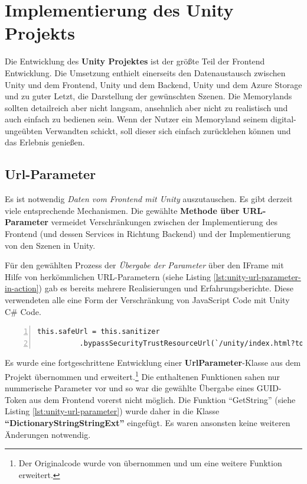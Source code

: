 \section{Implementierung des Unity Projekts}

Die Entwicklung des \textbf{Unity Projektes} ist der grö\ss{}te Teil der Frontend Entwicklung. Die Umsetzung enthielt einerseits den Datenaustausch zwischen Unity und dem Frontend, Unity und dem Backend, Unity und dem Azure Storage und zu guter Letzt, die Darstellung der gewünschten Szenen. Die Memorylands sollten detailreich aber nicht langsam, ansehnlich aber nicht zu realistisch und auch einfach zu bedienen sein. Wenn der Nutzer ein Memoryland seinem digital-ungeübten Verwandten schickt, soll dieser sich einfach zurücklehen können und das Erlebnis genie\ss{}en.



\subsection{Url-Parameter}
\label{subsec:unity-url-parameter}

Es ist notwendig \emph{Daten vom Frontend mit Unity} auszutauschen. Es gibt derzeit viele entsprechende Mechanismen. Die gewählte \textbf{Methode über URL-Parameter} vermeidet Verschränkungen zwischen der Implementierung des Frontend (und dessen Services in Richtung Backend) und der Implementierung von den Szenen in Unity.


Für den gewählten Prozess der \emph{Übergabe der Parameter} über den IFrame mit Hilfe von herkömmlichen URL-Parametern (siehe Listing \ref{lst:unity-url-parameter-in-action}) gab es bereits mehrere Realisierungen und Erfahrungsberichte. Diese verwendeten alle eine Form der Verschränkung von JavaScript Code mit Unity C\# Code. 



\begin{lstlisting}[numbers=left,caption={IFrame for Unity in Frontend},label={lst:unity-url-parameter-in-action}]
this.safeUrl = this.sanitizer
          .bypassSecurityTrustResourceUrl(`/unity/index.html?token=${myToken}& server=${environment.apiConfig.uri}`);
\end{lstlisting}


Es wurde eine fortgeschrittene Entwicklung einer \textbf{UrlParameter}-Klasse aus dem Projekt übernommen und erweitert.\footnote{Der Originalcode wurde von \cite{UrlParameter} übernommen und um eine weitere Funktion erweitert.} Die enthaltenen Funktionen sahen nur nummerische Parameter vor und so war die gewählte Übergabe eines GUID-Token aus dem Frontend vorerst nicht möglich. Die Funktion ``GetString'' (siehe Listing \ref{lst:unity-url-parameter}) wurde daher in die Klasse \textbf{``DictionaryStringStringExt''} eingefügt. Es waren ansonsten keine weiteren Änderungen notwendig.

